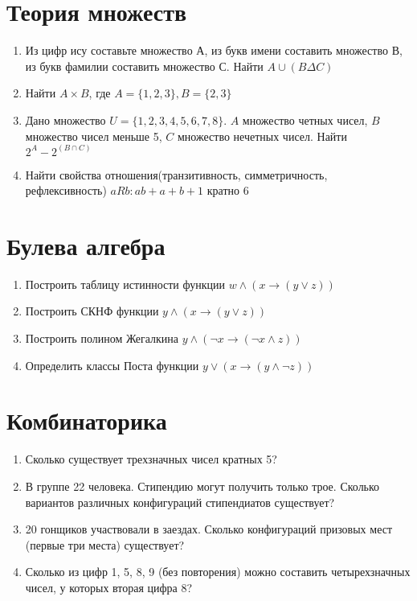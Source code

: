 \documentclass{paper}
\begin{document}
\section{Теория множеств}
\begin{enumerate}
    \item Из цифр ису составьте множество А, 
    из букв имени составить множество В, 
    из букв фамилии составить множество С. Найти $A \cup (B \Delta C)$
    \item Найти $A \times B$, где $A = \{1,2,3\}, B = \{2,3\}$
    \item Дано множество $U = \{1,2,3,4,5,6,7,8\}$. $A$ множество четных чисел, $B$ множество чисел меньше 5, $C$ множество нечетных чисел.
    Найти $2^A - 2^{(B \cap C)}$
    \item Найти свойства отношения(транзитивность, симметричность, рефлексивность) 
    $aRb: ab + a + b + 1$ кратно 6
\end{enumerate}
\section{Булева алгебра}
\begin{enumerate}
    \item Построить таблицу истинности функции $w \land (x \rightarrow (y \lor z))$
    \item Построить СКНФ функции $y \land (x \rightarrow (y \lor z))$
    \item Построить полином Жегалкина $y \land (\lnot x \rightarrow (\lnot x \land z))$
    \item Определить классы Поста функции $y \lor (x \rightarrow (y \land \lnot z))$
\end{enumerate}
\section{Комбинаторика}
\begin{enumerate}
    \item Сколько существует трехзначных чисел кратных 5?
    \item В группе 22 человека.
    Стипендию могут получить только трое.
    Сколько вариантов различных конфигураций стипендиатов существует?
    \item 20 гонщиков участвовали в заездах. 
    Сколько конфигураций призовых мест (первые три места) существует?
    \item Сколько из цифр 1, 5, 8, 9 (без повторения) можно составить четырехзначных чисел, у которых вторая цифра 8?
\end{enumerate}
\end{document}
